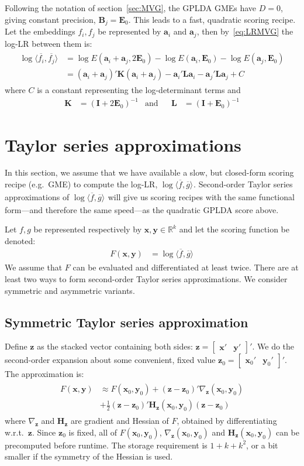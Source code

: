 \documentclass[a4paper,oneside,12pt,english]{report}
\def\zvec{\mathbf{z}}
\def\expv#1#2{\bigl\langle#1\bigr\rangle_{#2}}
\def\R{\mathbb{R}}
\def\Lmat{\mathbf{L}}
\def\Bmat{\mathbf{B}}
\def\Hmat{\mathbf{H}}
\def\Emat{\mathbf{E}}
\def\Imat{\mathbf{I}}
\def\Kmat{\mathbf{K}}
\def\yvec{\mathbf{y}}
\def\xvec{\mathbf{x}}
\def\avec{\mathbf{a}}
\def\dot#1#2{\expv{#1,#2}{}}
\def\normal#1{\overline{#1}}
\def\dotn#1#2{\dot{\normal{#1}}{\normal{#2}}}
\def\bmat#1{\begin{bmatrix}#1\end{bmatrix}}
\begin{document}
Following the notation of section~\ref{sec:MVG}, the GPLDA GMEs have $D=0$, giving constant precision, $\Bmat_j=\Emat_0$. This leads to a fast, quadratic scoring recipe. Let the embeddings $f_i,f_j$ be represented by $\avec_i$ and $\avec_j$, then by~\eqref{eq:LRMVG} the log-LR between them is:
\begin{align}
\label{eq:PLDAscore}
\begin{split}
\log\dotn{f_i}{f_j} &=\log E(\avec_i+\avec_j,2\Emat_0)  -\log E(\avec_i,\Emat_0) -\log E(\avec_j,\Emat_0) \\
&= (\avec_i+\avec_j)' \Kmat (\avec_i+\avec_j)
-\avec_i' \Lmat \avec_i -\avec_j' \Lmat \avec_j + C
\end{split}
\end{align} 
where $C$ is a constant representing the log-determinant terms and
\begin{align}
\Kmat &= (\Imat+2\Emat_0)^{-1}&\text{and} && \Lmat &=(\Imat+\Emat_0)^{-1}
\end{align}

\section{Taylor series approximations}
\label{sec:TSapr}
In this section, we assume that we have available a slow, but closed-form scoring recipe (e.g.\ GME) to compute the log-LR, $\log\dotn{f}{g}$. Second-order Taylor series approximations of $\log\dotn{f}{g}$ will give us scoring recipes with the same functional form---and therefore the same speed---as the quadratic GPLDA score above. 

Let $f,g$ be represented respectively by $\xvec,\yvec\in\R^k$ and let the scoring function be denoted: 
\begin{align}
F(\xvec,\yvec) &= \log\dotn{f}{g}
\end{align} 
We assume that $F$ can be evaluated and differentiated at least twice. There are at least two ways to form second-order Taylor series approximations. We consider symmetric and asymmetric variants.

\subsection{Symmetric Taylor series approximation}
Define $\zvec$ as the stacked vector containing both sides: $\zvec=\bmat{\xvec'&\yvec'}'$. We do the second-order expansion about some convenient, fixed value $\zvec_0=\bmat{\xvec_0'&\yvec_0'}'$. The approximation is:
\begin{align}
\begin{split}
F(\xvec,\yvec) &\approx F(\xvec_0,\yvec_0) + (\zvec-\zvec_0)'\nabla_\zvec(\xvec_0,\yvec_0)\\ 
&+ \frac12(\zvec-\zvec_0)'\Hmat_\zvec(\xvec_0,\yvec_0)(\zvec-\zvec_0)
\end{split}
\end{align} 
where $\nabla_\zvec$ and $\Hmat_\zvec$ are gradient and Hessian of $F$, obtained by differentiating w.r.t.\ $\zvec$. Since $\zvec_0$ is fixed, all of $F(\xvec_0,\yvec_0)$, $\nabla_\zvec(\xvec_0,\yvec_0)$ and $\Hmat_\zvec(\xvec_0,\yvec_0)$ can be precomputed before runtime. The storage requirement is $1 + k + k^2$, or a bit smaller if the symmetry of the Hessian is used.
\end{document}
